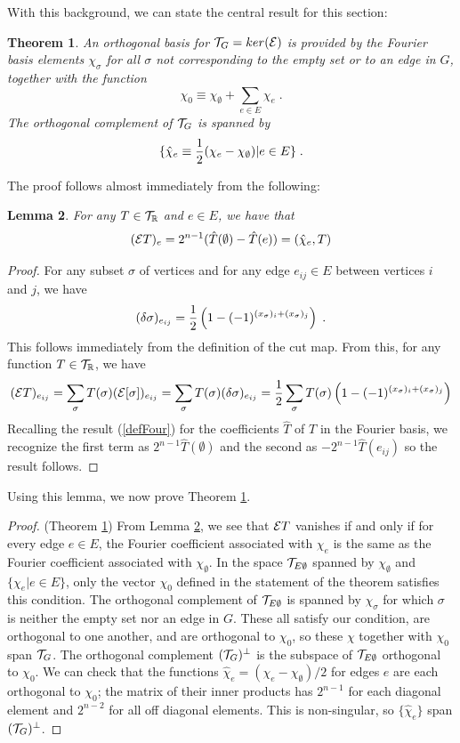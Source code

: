 \documentclass[12pt]{article}
\newtheorem{theorem}{Theorem}[section]
\newtheorem{lemma}[theorem]{Lemma}
\theoremstyle{definition}
\begin{document}
With this background, we can state the central result for this section:
\begin{theorem}\label{thm:Fourier}
An orthogonal basis for ${\cal T}_G = ker({\cal E})$ is provided by the Fourier basis elements $\chi_\sigma$ for all $\sigma$ not corresponding to the empty set or to an edge in $G$, together with the function
\[
\chi_0 \equiv \chi_\emptyset + \sum_{e \in E} \chi_e \; . 
\]
The orthogonal complement of ${\cal T}_G$ is spanned by
\[
\{\hat{\chi}_e \equiv {1\over 2} (\chi_e - \chi_\emptyset) | e \in E \} \; . 
\]
\end{theorem}
The proof follows almost immediately from the following:
\begin{lemma}\label{lem:Eaction}
    For any $T \in {\cal T}_\mathbb{R}$ and $e \in E$, we have that
\[
({\cal E} T)_e =  2^{n-1}(\hat{T}(\emptyset) - \hat{T}(e)) = (\hat{\chi}_e, T) 
\]
\end{lemma}
\begin{proof}
For any subset $\sigma$ of vertices and for any edge $e_{ij} \in E$ between vertices $i$ and $j$, we have
\[
(\delta \sigma)_{e_{ij}} = {1 \over 2} \left( 1- (-1)^{(x_{\sigma})_i + (x_\sigma)_j} \right) \; .
\]
This follows immediately from the definition of the cut map. From this, for any function $T \in {\cal T}_\mathbb{R}$, we have 
\[
({\cal E} T)_{e_{ij}} = \sum_{\sigma} T(\sigma) ({\cal E} [\sigma])_{e_{ij}} = \sum_{\sigma} T(\sigma) (\delta \sigma)_{e_{ij}} = {1 \over 2} \sum_{\sigma} T(\sigma) \left( 1- (-1)^{(x_{\sigma})_i + (x_\sigma)_j} \right)
\]
Recalling the result (\ref{defFour}) for the coefficients $\hat{T}$ of $T$ in the Fourier basis, we recognize the first term as $2^{n-1} \hat{T}(\emptyset)$ and the second as $-2^{n-1} \hat{T}(e_{ij})$ so the result follows.
\end{proof}
Using this lemma, we now prove Theorem \ref{thm:Fourier}.
\begin{proof} (Theorem \ref{thm:Fourier})
From Lemma \ref{lem:Eaction}, we see that ${\cal E} T$ vanishes if and only if for every edge $e \in E$, the Fourier coefficient associated with $\chi_e$ is the same as the Fourier coefficient associated with $\chi_\emptyset$. In the space ${\cal T}_{E \emptyset}$ spanned by $\chi_\emptyset$ and $\{\chi_e | e \in E\}$, only the vector $\chi_0$ defined in the statement of the theorem satisfies this condition. The orthogonal complement of ${\cal T}_{E \emptyset}$ is spanned by $\chi_\sigma$ for which $\sigma$ is neither the empty set nor an edge in $G$. These all  satisfy our condition, are orthogonal to one another, and are orthogonal to $\chi_0$, so these $\chi$ together with $\chi_0$ span ${\cal T}_G$. The orthogonal complement  $({\cal T}_G)^\perp$ is the subspace of ${\cal T}_{E \emptyset}$ orthogonal to $\chi_0$. We can check that the functions $\hat{\chi}_e = (\chi_e - \chi_\emptyset)/2$ for edges $e$ are each orthogonal to $\chi_0$; the matrix of their inner products has $2^{n-1}$ for each diagonal element and $2^{n-2}$ for all off diagonal elements. This is non-singular, so $\{\hat{\chi}_e\}$ span $({\cal T}_G)^\perp$.
\end{proof}
\end{document}
